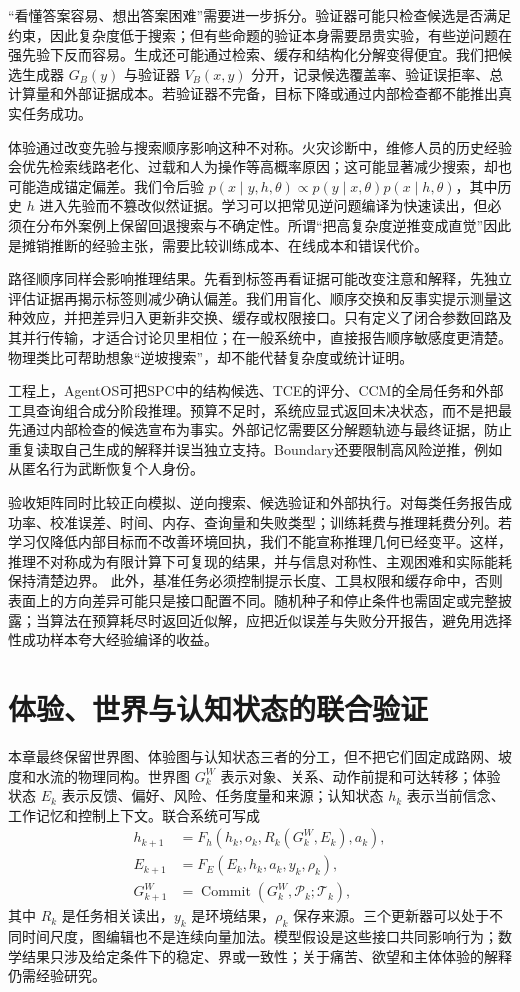 “看懂答案容易、想出答案困难”需要进一步拆分。验证器可能只检查候选是否满足约束，因此复杂度低于搜索；但有些命题的验证本身需要昂贵实验，有些逆问题在强先验下反而容易。生成还可能通过检索、缓存和结构化分解变得便宜。我们把候选生成器 $G_B(y)$ 与验证器 $V_B(x,y)$ 分开，记录候选覆盖率、验证误拒率、总计算量和外部证据成本。若验证器不完备，目标下降或通过内部检查都不能推出真实任务成功。

体验通过改变先验与搜索顺序影响这种不对称。火灾诊断中，维修人员的历史经验会优先检索线路老化、过载和人为操作等高概率原因；这可能显著减少搜索，却也可能造成锚定偏差。我们令后验 $p(x\mid y,h,\theta)\propto p(y\mid x,\theta)p(x\mid h,\theta)$，其中历史 $h$ 进入先验而不篡改似然证据。学习可以把常见逆问题编译为快速读出，但必须在分布外案例上保留回退搜索与不确定性。所谓“把高复杂度逆推变成直觉”因此是摊销推断的经验主张，需要比较训练成本、在线成本和错误代价。

路径顺序同样会影响推理结果。先看到标签再看证据可能改变注意和解释，先独立评估证据再揭示标签则减少确认偏差。我们用盲化、顺序交换和反事实提示测量这种效应，并把差异归入更新非交换、缓存或权限接口。只有定义了闭合参数回路及其并行传输，才适合讨论贝里相位；在一般系统中，直接报告顺序敏感度更清楚。物理类比可帮助想象“逆坡搜索”，却不能代替复杂度或统计证明。

工程上，AgentOS可把SPC中的结构候选、TCE的评分、CCM的全局任务和外部工具查询组合成分阶段推理。预算不足时，系统应显式返回未决状态，而不是把最先通过内部检查的候选宣布为事实。外部记忆需要区分解题轨迹与最终证据，防止重复读取自己生成的解释并误当独立支持。Boundary还要限制高风险逆推，例如从匿名行为武断恢复个人身份。

验收矩阵同时比较正向模拟、逆向搜索、候选验证和外部执行。对每类任务报告成功率、校准误差、时间、内存、查询量和失败类型；训练耗费与推理耗费分列。若学习仅降低内部目标而不改善环境回执，我们不能宣称推理几何已经变平。这样，推理不对称成为有限计算下可复现的结果，并与信息对称性、主观困难和实际能耗保持清楚边界。
此外，基准任务必须控制提示长度、工具权限和缓存命中，否则表面上的方向差异可能只是接口配置不同。随机种子和停止条件也需固定或完整披露；当算法在预算耗尽时返回近似解，应把近似误差与失败分开报告，避免用选择性成功样本夸大经验编译的收益。

\section{体验、世界与认知状态的联合验证}
\label{sec:section_9906}
本章最终保留世界图、体验图与认知状态三者的分工，但不把它们固定成路网、坡度和水流的物理同构。世界图 $G^W_k$ 表示对象、关系、动作前提和可达转移；体验状态 $E_k$ 表示反馈、偏好、风险、任务度量和来源；认知状态 $h_k$ 表示当前信念、工作记忆和控制上下文。联合系统可写成
\[
\begin{aligned}
h_{k+1}&=F_h(h_k,o_k,R_k(G^W_k,E_k),a_k),\\
E_{k+1}&=F_E(E_k,h_k,a_k,y_k,\rho_k),\\
G^W_{k+1}&=\operatorname{Commit}(G^W_k,\mathcal P_k;\mathcal T_k),
\end{aligned}
\]
其中 $R_k$ 是任务相关读出，$y_k$ 是环境结果，$\rho_k$ 保存来源。三个更新器可以处于不同时间尺度，图编辑也不是连续向量加法。模型假设是这些接口共同影响行为；数学结果只涉及给定条件下的稳定、界或一致性；关于痛苦、欲望和主体体验的解释仍需经验研究。

